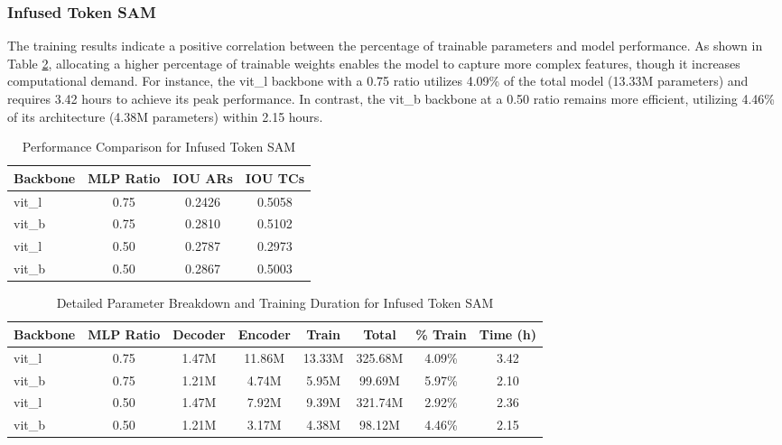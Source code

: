 \subsubsection{Infused Token SAM}

The training results indicate a positive correlation between the percentage of 
trainable parameters and model performance. As shown in Table 
\ref{tab:infused_token_params}, allocating a higher percentage of trainable 
weights enables the model to capture more complex features, though it increases 
computational demand. For instance, the vit\_l backbone with a 0.75 ratio 
utilizes 4.09\% of the total model (13.33M parameters) and requires 3.42 hours 
to achieve its peak performance. In contrast, the vit\_b backbone at a 0.50 
ratio remains more efficient, utilizing 4.46\% of its architecture (4.38M 
parameters) within 2.15 hours.

\begin{table}[h]
\centering
\begin{tabular}{lccc}
\hline
Backbone & MLP Ratio & IOU ARs & IOU TCs \\
\hline
vit\_l & 0.75 & 0.2426 & 0.5058 \\
vit\_b & 0.75 & 0.2810 & 0.5102 \\
vit\_l & 0.50 & 0.2787 & 0.2973 \\
vit\_b & 0.50 & 0.2867 & 0.5003 \\
\hline
\end{tabular}
\caption{Performance Comparison for Infused Token SAM}
\label{tab:infused_token_perf}
\end{table}

\begin{table}[h]
\centering
\begin{tabular}{lccccccc}
\hline
Backbone & MLP Ratio & Decoder & Encoder & Train & Total & \% Train & Time (h) \\
\hline
vit\_l & 0.75 & 1.47M & 11.86M & 13.33M & 325.68M & 4.09\% & 3.42 \\
vit\_b & 0.75 & 1.21M & 4.74M & 5.95M & 99.69M & 5.97\% & 2.10 \\
vit\_l & 0.50 & 1.47M & 7.92M & 9.39M & 321.74M & 2.92\% & 2.36 \\
vit\_b & 0.50 & 1.21M & 3.17M & 4.38M & 98.12M & 4.46\% & 2.15 \\
\hline
\end{tabular}
\caption{Detailed Parameter Breakdown and Training Duration for Infused Token SAM}
\label{tab:infused_token_params}
\end{table}

